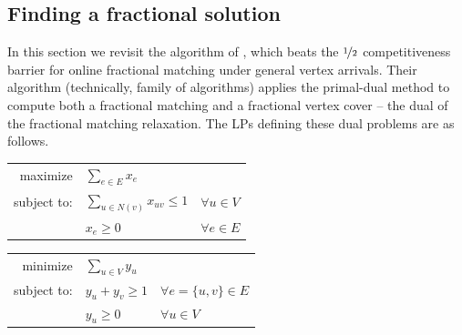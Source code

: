 \subsection{Finding a fractional solution}\label{sec:fractional-algo}
In this section we revisit the algorithm of \citet{wang2015two}, which beats the $\nicefrac{1}{2}$ competitiveness barrier for online fractional matching under general vertex arrivals. 
Their algorithm (technically, family of algorithms) applies the primal-dual method to compute both a fractional matching and a fractional vertex cover -- the dual of the fractional matching relaxation. The LPs defining these dual problems are as follows.

\begin{minipage}[t]{0.49\linewidth}

	\begin{center}
    \par\medskip
		\begin{tabular}{rll}
			maximize & $\sum_{e \in E} x_e$ \\
			subject to: & $\sum_{u \in N(v)} x_{uv}\leq 1$ & $\forall u\in V$ \\
			            & $ x_e \geq 0 $ & $ \forall e \in E$    \\ 
		\end{tabular}
	\end{center}
    \label{fig:primal-matching}	
\end{minipage}
\begin{minipage}[t]{0.49\linewidth}
	\begin{center}
    \par\medskip
		\begin{tabular}{rll}
			minimize & $\sum_{u \in V} y_u$ \\
			subject to: & $  y_u + y_v  \geq 1$ & $\forall e = \{u,v\} \in E$ \\
			            & $ y_u \geq 0 $ & $ \forall u \in V$    \\ 
		\end{tabular}
	\end{center}
	\vspace{-0.5cm}
    \label{fig:dual-vertexcover}
\end{minipage}

